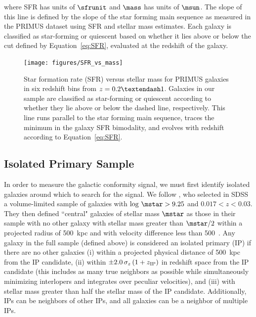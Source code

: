 \noindent where SFR has units of $\sfrunit$ and $\mass$ has units of $\msun$.
The slope of this line is defined by the slope of the star forming main sequence \citep{Noeske07} as measured in the PRIMUS dataset using \iSEDfit SFR and stellar mass estimates. 
Each galaxy is classified as star-forming or quiescent based on whether it lies above or below the cut defined by Equation~\ref{eq:SFR}, evaluated at the redshift of the galaxy.

\begin{figure}
  \centering
  \texttt{[image: figures/SFR\_vs\_mass]}
  \caption{Star formation rate (SFR) versus stellar mass for PRIMUS galaxies in six redshift bins from ${z=0.2\textendash1}$.
Galaxies in our sample are classified as star-forming or quiescent according to whether they lie above or below the dashed line, respectively.
This line runs parallel to the star forming main sequence, traces the minimum in the galaxy SFR bimodality, and evolves with redshift according to Equation~\ref{eq:SFR}.
}
  \label{fig:SFR_vs_mass}
\end{figure}


\subsection{Isolated Primary Sample}\label{sec:IPsample}

In order to measure the galactic conformity signal, we must first identify isolated galaxies around which to search for the signal.
We follow \citet{Kauffmann13}, who selected in SDSS a volume-limited sample of galaxies with $\log\,\mstar>9.25$ and $0.017<z<0.03$.  They then defined ``central" galaxies of stellar mass $\mstar$ as those in their sample with no other galaxy with stellar mass greater than $\mstar/2$ within a projected radius of 500~kpc and with velocity difference less than 500~\kms.  Any galaxy in the full sample (defined above) is considered an isolated primary (IP) if there are no other galaxies
(i) within a projected physical distance of 500~kpc from the IP candidate,
(ii) within ${\pm 2.0\,\sigma_{z}\,(1 + z_{\rm IP})}$ in redshift space from the IP candidate (this includes as many true neighbors as possible while simultaneously minimizing interlopers and integrates over peculiar velocities), and
(iii) with stellar mass greater than half the stellar mass of the IP candidate.
Additionally, IPs can be neighbors of other IPs, and all galaxies can be a neighbor of multiple IPs. 

